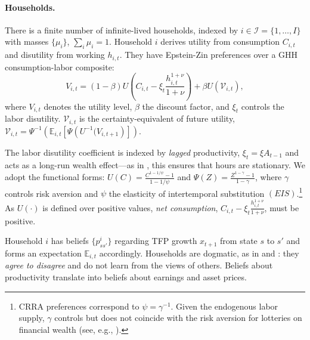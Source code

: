 \paragraph{Households.}
There is a finite number of infinite-lived households, indexed by $i \in \mathcal{I}= \{1, \ldots, I\}$ with masses $\{\mu_i\}$, $\sum_i \mu_i = 1$. Household $i$ derives utility from consumption $C_{i,t}$ and disutility from working $h_{i,t}$. They have Epstein-Zin preferences over a GHH consumption-labor composite:
\begin{equation}\label{eq: preferences}
    V_{i,t} = (1-\beta) U\left(C_{i,t} - \xi_t \frac{h_{i,t}^{1+\nu}}{1+\nu}\right) + \beta U\left( \mathcal{V}_{i,t} \right),
\end{equation}
where $V_{i,t}$ denotes the utility level, $\beta$ the discount factor, and $\xi_t$ controls the labor disutility. $\mathcal{V}_{i,t}$ is the certainty-equivalent of future utility, $\mathcal{V}_{i,t} = \Psi^ {-1}\left( \mathbb{E}_{i,t}\left[ \Psi\left( U^ {-1}(V_{i,t+1}\right)\right] \right)$.

The labor disutility coefficient is indexed by \textit{lagged} productivity, $\xi_{t} = \xi A_{t-1}$ and acts as a long-run wealth effect---as in \citet{JR09}, this ensures that hours are stationary. 
We adopt the functional forms: $U(C) = \frac{C^{1-1/\psi}-1}{1-1/\psi}$ and $\Psi(Z) = \frac{Z^{1-\gamma} -1}{1-\gamma}$, where $\gamma$ controls risk aversion and $\psi$ the elasticity of intertemporal substitution $(EIS)$.\footnote{CRRA preferences correspond to $\psi = \gamma^{-1}$.
Given the endogenous labor supply, $\gamma$ controls but does not coincide with the risk aversion for lotteries on financial wealth (see, e.g., \citealt{swanson2018risk}).
} As $U(\cdot)$ is defined over positive values, \textit{net consumption}, $C_{i,t} - \xi_t \frac{h_{i,t}^{1+\nu}}{1+\nu}$, must be positive.

Household $i$ has beliefs $\{p^i_{ss'}\}$ regarding TFP growth $x_{t+1}$ from state $s$ to $s'$ and forms an expectation $\mathbb{E}_{i,t}$ accordingly. Households are dogmatic, as in \citet{chen2012rare} and \citet{simsek2013speculation}: they \textit{agree to disagree} and do not learn from the views of others. 
Beliefs about productivity translate into beliefs about earnings and asset prices.

